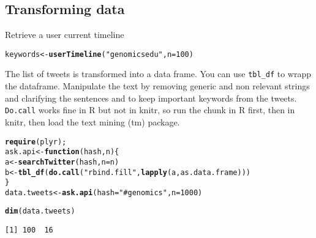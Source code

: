 \documentclass[9pt,english]{extarticle}\usepackage[]{graphicx}\usepackage[]{color}
\makeatletter
\newcommand{\hlnum}[1]{\textcolor[rgb]{0.686,0.059,0.569}{#1}}%
\newcommand{\hlstr}[1]{\textcolor[rgb]{0.192,0.494,0.8}{#1}}%
\newcommand{\hlstd}[1]{\textcolor[rgb]{0.345,0.345,0.345}{#1}}%
\newcommand{\hlkwa}[1]{\textcolor[rgb]{0.161,0.373,0.58}{\textbf{#1}}}%
\newcommand{\hlkwb}[1]{\textcolor[rgb]{0.69,0.353,0.396}{#1}}%
\newcommand{\hlkwc}[1]{\textcolor[rgb]{0.333,0.667,0.333}{#1}}%
\newcommand{\hlkwd}[1]{\textcolor[rgb]{0.737,0.353,0.396}{\textbf{#1}}}%
\newenvironment{kframe}{%
 \def\at@end@of@kframe{}%
 \ifinner\ifhmode%
  \def\at@end@of@kframe{\end{minipage}}%
  \begin{minipage}{\columnwidth}%
 \fi\fi%
 \def\FrameCommand##1{\hskip\@totalleftmargin \hskip-\fboxsep
 \colorbox{shadecolor}{##1}\hskip-\fboxsep
     \hskip-\linewidth \hskip-\@totalleftmargin \hskip\columnwidth}%
 \MakeFramed {\advance\hsize-\width
   \@totalleftmargin\z@ \linewidth\hsize
   \@setminipage}}%
 {\par\unskip\endMakeFramed%
 \at@end@of@kframe}
\newenvironment{knitrout}{}{} %
\makeatother
\begin{document}
\begin{linenumbers}
\subsection{Transforming data }
\label{subsec:transformation}

\noindent
Retrieve a user current timeline
\begin{knitrout}
\color{fgcolor}\begin{kframe}
\begin{alltt}
\hlstd{keywords} \hlkwb{<-} \hlkwd{userTimeline}\hlstd{(}\hlstr{"genomicsedu"}\hlstd{,} \hlkwc{n}\hlstd{=}\hlnum{100}\hlstd{)}
\end{alltt}
\end{kframe}
\end{knitrout}


\noindent
The list of tweets is transformed into a data frame. You can use \verb|tbl_df| to wrapp the dataframe. 
Manipulate the text by removing generic and non relevant strings and clarifying the sentences and to keep important keywords from the tweets.
\verb|Do.call| works fine in R but not in knitr, so run the chunk in R first, then in knitr, then load the text mining (tm) package. 
\begin{knitrout}
\color{fgcolor}\begin{kframe}
\begin{alltt}
\hlkwd{require}\hlstd{(plyr);}
\hlstd{ask.api} \hlkwb{<-} \hlkwa{function}\hlstd{(}\hlkwc{hash}\hlstd{,}\hlkwc{n}\hlstd{)\{}
    \hlstd{a} \hlkwb{<-} \hlkwd{searchTwitter}\hlstd{(hash,} \hlkwc{n}\hlstd{=n)}
    \hlstd{b} \hlkwb{<-} \hlkwd{tbl_df}\hlstd{(}\hlkwd{do.call}\hlstd{(}\hlstr{"rbind.fill"}\hlstd{,}\hlkwd{lapply}\hlstd{(a, as.data.frame)))}
\hlstd{\}}
\hlstd{data.tweets} \hlkwb{<-} \hlkwd{ask.api}\hlstd{(}\hlkwc{hash}\hlstd{=}\hlstr{"#genomics"}\hlstd{,}\hlkwc{n}\hlstd{=}\hlnum{1000}\hlstd{)}
\end{alltt}


{\ttfamily\noindent\color{warningcolor}{Warning: 1000 tweets were requested but the API can only return 100}}

{\ttfamily\noindent\bfseries{}}\begin{alltt}
\hlkwd{dim}\hlstd{(data.tweets)}
\end{alltt}
\begin{verbatim}
[1] 100  16
\end{verbatim}
\end{kframe}
\end{knitrout}


\end{linenumbers}
\end{document}
